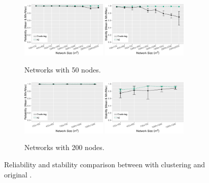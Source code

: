 \begin{figure}[bt]
    \centering
    \begin{subfigure}{\textwidth}
            \centering
            \includegraphics[width=0.45\textwidth]{figure/Results/ChaosComparison/ChaosComparison_50_Reliability.pdf}
            \includegraphics[width=0.45\textwidth]{figure/Results/ChaosComparison/ChaosComparison_50_Stability.pdf}
            \caption{Networks with 50 nodes.}
            \label{subfig:reliability-50-nodes}
    \end{subfigure}
    \hfill
    \begin{subfigure}{\textwidth}
        \centering
        \includegraphics[width=0.45\textwidth]{figure/Results/ChaosComparison/ChaosComparison_200_Reliability.pdf}
        \includegraphics[width=0.45\textwidth]{figure/Results/ChaosComparison/ChaosComparison_200_Stability.pdf}
        \caption{Networks with 200 nodes.}
        \label{subfig:reliabilty-200-nodes}
    \end{subfigure}
    \caption{Reliability and stability comparison between \atwo{} with clustering and original \atwo{}.}
    \label{fig:reliability-result}
\end{figure}



